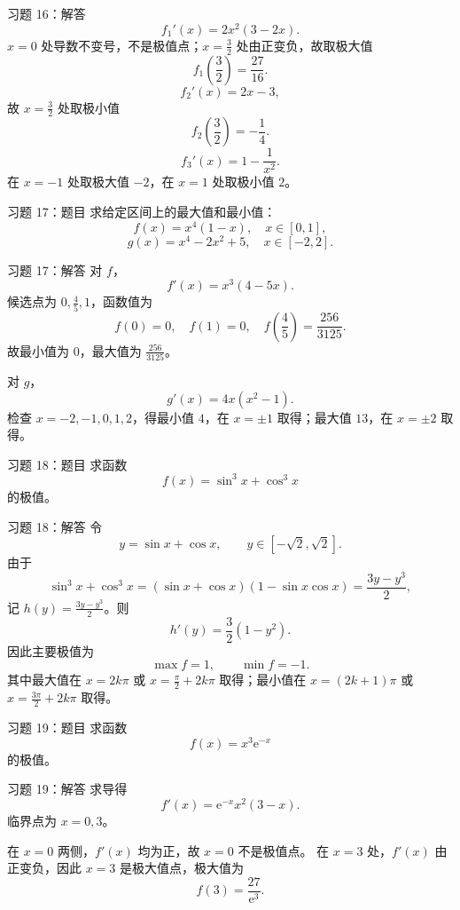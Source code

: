 \documentclass[aspectratio=169,10pt]{ctexbeamer}
\newcommand{\ee}{\mathrm{e}}
\begin{document}
\begin{frame}[t]{习题 16：解答}
\footnotesize
\[
  f_1'(x)=2x^2(3-2x).
\]
$x=0$ 处导数不变号，不是极值点；$x=\frac32$ 处由正变负，故取极大值
\[
  f_1\left(\frac32\right)=\frac{27}{16}.
\]
\[
  f_2'(x)=2x-3,
\]
故 $x=\frac32$ 处取极小值
\[
  f_2\left(\frac32\right)=-\frac14.
\]
\[
  f_3'(x)=1-\frac1{x^2}.
\]
在 $x=-1$ 处取极大值 $-2$，在 $x=1$ 处取极小值 $2$。
\end{frame}

\begin{frame}[t]{习题 17：题目}
\small
求给定区间上的最大值和最小值：
\[
  f(x)=x^4(1-x),\quad x\in[0,1],
\]
\[
  g(x)=x^4-2x^2+5,\quad x\in[-2,2].
\]
\end{frame}

\begin{frame}[t]{习题 17：解答}
\small
对 $f$，
\[
  f'(x)=x^3(4-5x).
\]
候选点为 $0,\frac45,1$，函数值为
\[
  f(0)=0,\quad f(1)=0,\quad
  f\left(\frac45\right)=\frac{256}{3125}.
\]
故最小值为 $0$，最大值为 $\frac{256}{3125}$。

对 $g$，
\[
  g'(x)=4x(x^2-1).
\]
检查 $x=-2,-1,0,1,2$，得最小值 $4$，在 $x=\pm1$ 取得；最大值 $13$，在 $x=\pm2$ 取得。
\end{frame}

\begin{frame}[t]{习题 18：题目}
\small
求函数
\[
  f(x)=\sin^3x+\cos^3x
\]
的极值。
\end{frame}

\begin{frame}[t]{习题 18：解答}
\small
令
\[
  y=\sin x+\cos x,\qquad y\in[-\sqrt2,\sqrt2].
\]
由于
\[
  \sin^3x+\cos^3x
  =(\sin x+\cos x)(1-\sin x\cos x)
  =\frac{3y-y^3}{2},
\]
记 $h(y)=\frac{3y-y^3}{2}$。则
\[
  h'(y)=\frac32(1-y^2).
\]
因此主要极值为
\[
  \max f=1,\qquad \min f=-1.
\]
其中最大值在 $x=2k\pi$ 或 $x=\frac\pi2+2k\pi$ 取得；最小值在 $x=(2k+1)\pi$ 或 $x=\frac{3\pi}{2}+2k\pi$ 取得。
\end{frame}

\begin{frame}[t]{习题 19：题目}
\small
求函数
\[
  f(x)=x^3\ee^{-x}
\]
的极值。
\end{frame}

\begin{frame}[t]{习题 19：解答}
\small
求导得
\[
  f'(x)=\ee^{-x}x^2(3-x).
\]
临界点为 $x=0,3$。

在 $x=0$ 两侧，$f'(x)$ 均为正，故 $x=0$ 不是极值点。
在 $x=3$ 处，$f'(x)$ 由正变负，因此 $x=3$ 是极大值点，极大值为
\[
\boxed{f(3)=\frac{27}{\ee^3}.}
\]
\end{frame}
\end{document}
